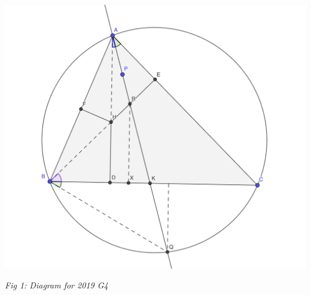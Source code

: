 \documentclass{article}
\theoremstyle{mytheoremstyle}
\theoremstyle{mytheoremstyle}
\theoremstyle{myproblemstyle}
\begin{document}
    \begin{center}
        \includegraphics[scale=0.4]{2019 G4.png}

        \textit{Fig 1: Diagram for 2019 G4}
    \end{center}
\end{document}
